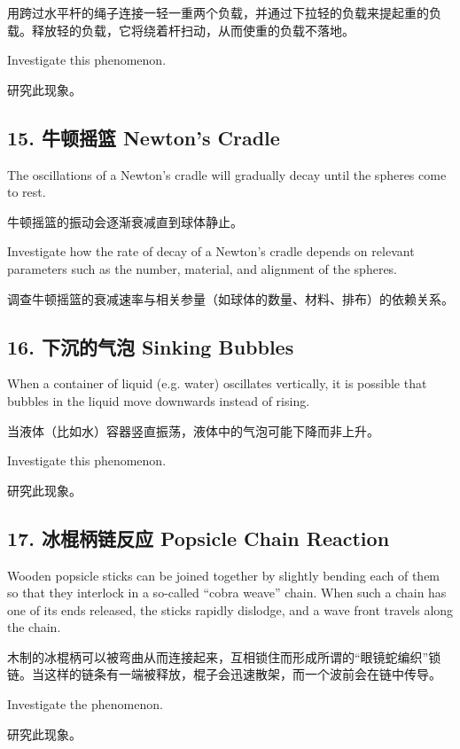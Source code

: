\documentclass[a4paper,10pt,english]{sphinxmanual}
\begin{document}
用跨过水平杆的绳子连接一轻一重两个负载，并通过下拉轻的负载来提起重的负载。释放轻的负载，它将绕着杆扫动，从而使重的负载不落地。

Investigate this phenomenon.

研究此现象。


\subsection{15. 牛顿摇篮 Newton’s Cradle}
\label{\detokenize{7. Appendix:newtons-cradle}}
The oscillations of a Newton’s cradle will gradually decay until the spheres come to rest.

牛顿摇篮的振动会逐渐衰减直到球体静止。

Investigate how the rate of decay of a Newton’s cradle depends on relevant parameters such as the number, material, and alignment of the spheres.

调查牛顿摇篮的衰减速率与相关参量（如球体的数量、材料、排布）的依赖关系。


\subsection{16. 下沉的气泡 Sinking Bubbles}
\label{\detokenize{7. Appendix:sinking-bubbles}}
When a container of liquid (e.g. water) oscillates vertically, it is possible that bubbles in the liquid move downwards instead of rising.

当液体（比如水）容器竖直振荡，液体中的气泡可能下降而非上升。

Investigate this phenomenon.

研究此现象。


\subsection{17. 冰棍柄链反应 Popsicle Chain Reaction}
\label{\detokenize{7. Appendix:popsicle-chain-reaction}}
Wooden popsicle sticks can be joined together by slightly bending each of them so that they interlock in a so-called “cobra weave” chain. When such a chain has one of its ends released, the sticks rapidly dislodge, and a wave front travels along the chain.

木制的冰棍柄可以被弯曲从而连接起来，互相锁住而形成所谓的“眼镜蛇编织”锁链。当这样的链条有一端被释放，棍子会迅速散架，而一个波前会在链中传导。

Investigate the phenomenon.

研究此现象。
\end{document}
